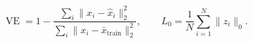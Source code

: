 \begin{equation}
    \operatorname{VE}
    = 1-
      \frac{\sum_i\lVert x_i-\hat{x}_i\rVert_2^2}
           {\sum_i\lVert x_i-\bar{x}_{\mathrm{train}}\rVert_2^2},
    \qquad
    L_0 = \frac{1}{N}\sum_{i=1}^{N}\lVert z_i\rVert_0 .
\end{equation}
